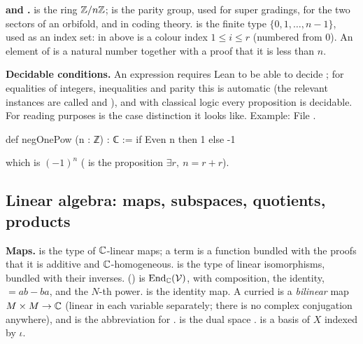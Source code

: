 \textbf{ and .}  is the ring ${\mathbb{Z}}/n{\mathbb{Z}}$;  is the
parity group, used for super gradings, for the two sectors of an orbifold, and in coding theory.
 is the finite type $\{0,1,\dots,n-1\}$, used as an index set:  in
 above is a colour index $1\le i\le r$ (numbered from $0$). An element of 
is a natural number together with a proof that it is less than $n$.

\textbf{Decidable conditions.} An expression  requires Lean to be able to
decide ; for equalities of integers, inequalities and parity this is automatic (the relevant
instances are called  and ), and with classical logic every
proposition is decidable. For reading purposes  is the case distinction it
looks like. Example:
\noindent File .
\begin{leancode}
def negOnePow (n : ℤ) : ℂ := if Even n then 1 else -1
\end{leancode}
which is $(-1)^n$ ( is the proposition $\exists r,\ n = r + r$).

\subsection{Linear algebra: maps, subspaces, quotients, products}\label{ch01:sec:linalg}

\textbf{Maps.}  is the type of ${\mathbb{C}}$-linear maps; a term is a function bundled with
the proofs that it is additive and ${\mathbb{C}}$-homogeneous.  is the type of linear
isomorphisms, bundled with their inverses.  () is
$\operatorname{End}_{\mathbb{C}}(\mathcal{V})$, with \lean{*} composition,  the identity,  $=ab-ba$, and
 the $N$-th power.  is the identity map. A curried
 is a \emph{bilinear} map $M\times M\to{\mathbb{C}}$ (linear in each variable
separately; there is no complex conjugation anywhere), and  is the
abbreviation for .  is the dual space
.  is a basis of $X$ indexed by $\iota$.

